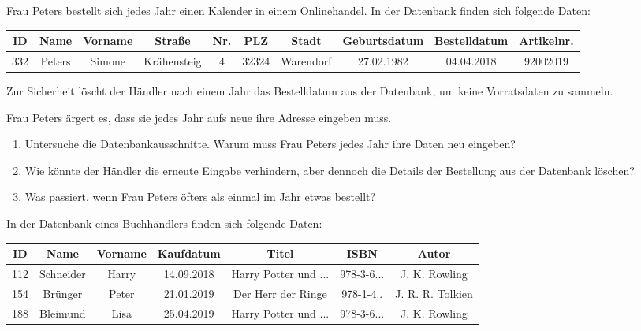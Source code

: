 \documentclass[10pt, a5paper,landscape]{arbeitsblatt}
\renewcommand{\ReiheTitel}[1][\Titel]{%
 \begin{minipage}{.49\textwidth}%
	\usekomafont{titel}{#1}%
 \end{minipage}\hfill\begin{minipage}{.49\textwidth}%
	\hspace*{\fill}\usekomafont{reihe}{\Reihe}%
 \end{minipage}
 \titlerule%
}
\begin{document}
\clearpage
\ReiheTitel

Frau Peters bestellt sich jedes Jahr einen Kalender in einem Onlinehandel. In der Datenbank finden sich folgende Daten:

{\footnotesize
\begin{tabular}{|*{10}{c|}}\hline
	\rowcolor{ab.tabelle.kopf.hg} ID & Name & Vorname & Straße & Nr. & PLZ & Stadt & Geburtsdatum & Bestelldatum & Artikelnr. \\ \hline
	332 & Peters & Simone & Krähensteig & 4 & 32324 & Warendorf & 27.02.1982 & 04.04.2018 & 92002019 \\\hline
\end{tabular}}

Zur Sicherheit löscht der Händler nach einem Jahr das Bestelldatum aus der Datenbank, um keine Vorratsdaten zu sammeln.

Frau Peters ärgert es, dass sie jedes Jahr aufs neue ihre Adresse eingeben muss.

\vspace{1em}
\begin{aufgabe}
\begin{enumerate}
	\item Untersuche die Datenbankausschnitte. Warum muss Frau Peters jedes Jahr ihre Daten neu eingeben?
	\item Wie könnte der Händler die erneute Eingabe verhindern, aber dennoch die Details der Bestellung aus der Datenbank löschen?
	\item Was passiert, wenn Frau Peters öfters als einmal im Jahr etwas bestellt? 
\end{enumerate}
\end{aufgabe}

\clearpage
\ReiheTitel

In der Datenbank eines Buchhändlers finden sich folgende Daten:

{\footnotesize
\begin{tabular}{|*{7}{c|}}\hline
	\rowcolor{ab.tabelle.kopf.hg} ID & Name & Vorname & Kaufdatum & Titel & ISBN & Autor\\ \hline
	112 & Schneider & Harry & 14.09.2018 & Harry Potter und ... & 978-3-6... & J. K. Rowling \\\hline
	154 & Brünger & Peter & 21.01.2019 & Der Herr der Ringe & 978-1-4.. & J. R. R. Tolkien \\\hline
	188 & Bleimund & Lisa & 25.04.2019 &  Harry Potter und ... & 978-3-6... & J. K. Rowling \\\hline
\end{tabular}}
\end{document}
